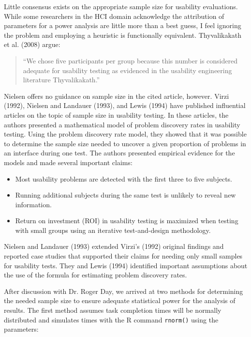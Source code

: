 \documentclass[11pt]{article}
\begin{document}
Little consensus exists on the appropriate sample size for usability evaluations. While some researchers in the HCI domain acknowledge the attribution of parameters for a power analysis are little more than a best guess\cite{Virzi:1992ve,Lewis:1994ly,Turner:2006zr,Nielsen:1993ys}, I feel ignoring the problem and employing a heuristic is functionally equivalent. Thyvalikakath et al. (2008) argue:
\begin{quote}
\small{``We chose five participants per group because this number is considered adequate for usability testing as evidenced in the usability engineering literature Thyvalikakath\cite{Nielsen1994Enhancing-the-e}.''}
\end{quote}
\noindent Nielsen offers no guidance on sample size in the cited article, however. Virzi (1992), Nielsen and Landauer (1993), and Lewis (1994) have published influential articles on the topic of sample size in usability testing. In these articles, the authors presented a mathematical model of problem discovery rates in usability testing. Using the problem discovery rate model, they showed that it was possible to determine the sample size needed to uncover a given proportion of problems in an interface during one test. The authors presented empirical evidence for the models and made several important claims:
\begin{itemize}
\item{Most usability problems are detected with the first three to five subjects.}
\item{Running additional subjects during the same test is unlikely to reveal new information.}
\item{Return on investment (ROI) in usability testing is maximized when testing with small groups using an iterative test-and-design methodology.}
\end{itemize}
Nielsen and Landauer (1993) extended Virzi’s (1992) original findings and reported case studies that supported their claims for needing only small samples for usability tests. They and Lewis (1994) identified important assumptions about the use of the formula for estimating problem discovery rates.

After discussion with Dr. Roger Day, we arrived at two methods for determining the needed sample size to ensure adequate statistical power for the analysis of results. The first method assumes task completion times will be normally distributed and simulates times with the \textsf{R} command \texttt{rnorm()} using the parameters:
\end{document}
